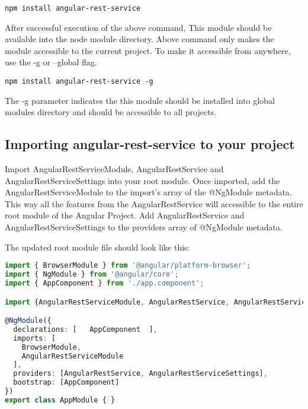 \begin{lstlisting}[language=command]
	npm install angular-rest-service
\end{lstlisting}
	
\hspace{0.2in}After successful execution of the above command, This module should be available into the node module directory. Above command only makes the module accessible to the current project. To make it accessible from anywhere, use the -g or --global flag.
	
\begin{lstlisting}[language=command]
	npm install angular-rest-service -g
\end{lstlisting}
	
\hspace{0.2in}The -g parameter indicates the this module should be installed into global modules directory and should be accessible to all projects.	
	

		
\subsection{Importing angular-rest-service to your project}

\hspace{0.2in}Import AngularRestServiceModule, AngularRestService and \\AngularRestServiceSettings into your root module. Once imported, add the AngularRestServiceModule to the import's array of the @NgModule metadata. This way all the features from the AngularRestService will accessible to the entire root module of the Angular Project. Add AngularRestService and AngularRestServiceSettings to the providers array of @NgModule metadata.
	
\hspace{0.2in}The updated root module file should look like this:
	
	
\begin{lstlisting}[language=Typescript]
import { BrowserModule } from '@angular/platform-browser';
import { NgModule } from '@angular/core';
import { AppComponent } from './app.component';

import {AngularRestServiceModule, AngularRestService, AngularRestServiceSettings} from 'angular-rest-service';

@NgModule({
  declarations: [   AppComponent  ],
  imports: [
    BrowserModule,
    AngularRestServiceModule
  ],
  providers: [AngularRestService, AngularRestServiceSettings],
  bootstrap: [AppComponent]
})
export class AppModule { }

\end{lstlisting}



